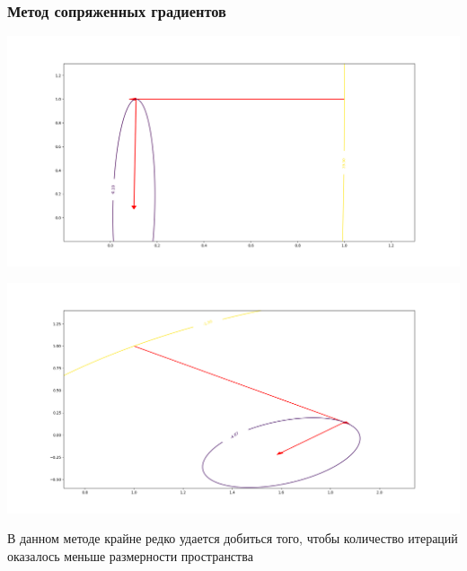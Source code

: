 \documentclass[english]{article}
\theoremstyle{plain}
\theoremstyle{remark}
\theoremstyle{definition}
\begin{document}
\subsubsection{Метод сопряженных градиентов}
\label{sec:org7435387}
\-
\begin{center}
\includegraphics[H,scale=0.3]{plots/traectories/conjugate_gradient_1.png}
\end{center}
\begin{center}
\includegraphics[H,scale=0.3]{plots/traectories/conjugate_gradient_2.png}
\end{center}

В данном методе крайне редко удается добиться того, чтобы количество
итераций оказалось меньше размерности пространства
\end{document}
